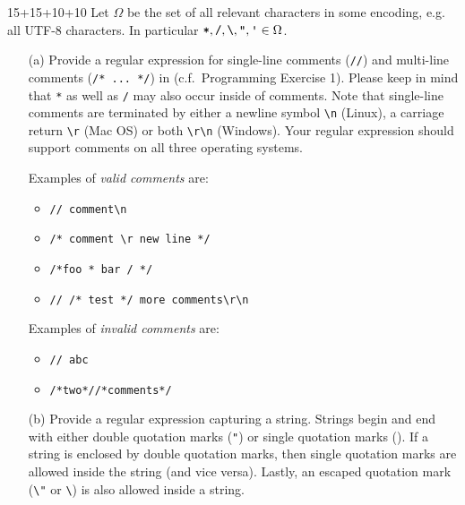 %
%
\begin{exercise}{15+15+10+10}
  Let $\Omega$ be the set of all relevant characters in some encoding, e.g. all UTF-8 characters.
  In particular $\texttt{*}, \texttt{/}, \texttt{\textbackslash}, \texttt{"}, \texttt{\textquotesingle} \in \Omega$.
  \begin{enumerate}
    \item[(a)] Provide a regular expression for single-line comments (\texttt{//}) and multi-line comments (\texttt{/* ... */}) in \while (c.f.\ Programming Exercise 1).
        Please keep in mind that \texttt{*} as well as \texttt{/} may also occur inside of comments.
        Note that single-line comments are terminated by either a newline symbol \texttt{\textbackslash{}n} (Linux), a carriage return \texttt{\textbackslash{}r} (Mac OS) or both \texttt{\textbackslash{}r\textbackslash{}n} (Windows).
        Your regular expression should support comments on all three operating systems.

        \begin{minipage}{0.49\textwidth}
        Examples of \emph{valid comments} are:
        \begin{itemize}
            \item \texttt{// comment\textbackslash{}n}
            \item \texttt{/* comment \textbackslash{}r new line */}
            \item \texttt{/*foo * bar / */}
            \item \texttt{// /* test */ more comments\textbackslash{}r\textbackslash{}n}
        \end{itemize}
      \end{minipage}
      \begin{minipage}{0.49\textwidth}
        Examples of \emph{invalid comments} are:
        \begin{itemize}
            \item \texttt{// abc}
            \item \texttt{/*two*//*comments*/}
        \end{itemize}
      \end{minipage}

    \item[(b)] Provide a regular expression capturing a string.
        Strings begin and end with either double quotation marks (\texttt{"}) or single quotation marks (\texttt{\textquotesingle}).
        If a string is enclosed by double quotation marks, then single quotation marks are allowed inside the string (and vice versa).
        Lastly, an escaped quotation mark (\texttt{\textbackslash{}"} or \texttt{\textbackslash{}\textquotesingle}) is also allowed inside a string.


\end{enumerate}
\end{exercise}
